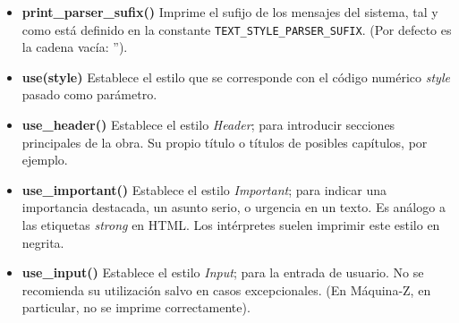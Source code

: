 \documentclass[a4paper,12pt]{article}
\numberwithin{equation}{section}
\begin{document}
\begin{itemize}
	\item \textbf{print\_parser\_sufix()} Imprime el sufijo de los mensajes del sistema, tal y como está definido en la constante \verb|TEXT_STYLE_PARSER_SUFIX|. (Por defecto es la cadena vacía: '').

	\item \textbf{use(style)} Establece el estilo que se corresponde con el código numérico \emph{style} pasado como parámetro.

	\item \textbf{use\_header()} Establece el estilo \emph{Header}; para introducir secciones principales de la obra. Su propio título o títulos de posibles capítulos, por ejemplo.

	\item \textbf{use\_important()} Establece el estilo \emph{Important}; para indicar una importancia destacada, un asunto serio, o urgencia en un texto. Es análogo a las etiquetas \emph{strong} en HTML. Los intérpretes suelen imprimir este estilo en negrita.

	\item \textbf{use\_input()} Establece el estilo \emph{Input}; para la entrada de usuario. No se recomienda su utilización salvo en casos excepcionales. (En Máquina-Z, en particular, no se imprime correctamente).


\end{itemize}
\end{document}
